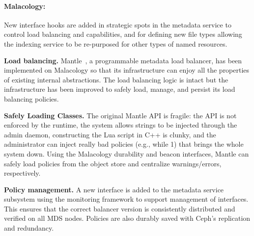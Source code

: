 \documentclass[preprint]{sigplanconf-eurosys}
\begin{document}

\paragraph*{Malacology:} New interface hooks are added in strategic spots in
the metadata service to control load balancing and capabilities, and for
defining new file types allowing the indexing service to be re-purposed for
other types of named resources.

{\bf Load balancing.} Mantle~\cite{sevilla:sc15-mantle}, a programmable
metadata load balancer, has been implemented on Malacology so that its
infrastructure can enjoy all the properties of existing internal abstractions. The load
balancing logic is intact but the infrastructure has been
improved to safely load, manage, and persist its load balancing policies. 

{\bf Safely Loading Classes.} The original Mantle API is fragile: the API is
not enforced by the runtime, the system allows strings to be injected through
the admin daemon, constructing the Lua script in C++ is clunky, and the
administrator can inject really bad policies (e.g., while 1) that brings the
whole system down. Using the Malacology durability and beacon interfaces,
Mantle can safely load policies from the object store and centralize
warnings/errors, respectively.

{\bf Policy management.} A new interface is added to the metadata service
subsystem using the monitoring framework to support management of interfaces.
This ensures that the correct balancer version is consistently distributed and
verified on all MDS nodes. Policies are also durably saved with Ceph's
replication and redundancy.
\end{document}
